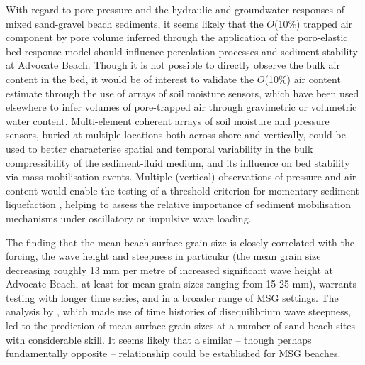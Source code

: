 With regard to pore pressure and the hydraulic and groundwater responses of mixed sand-gravel beach sediments, it seems likely that the $O$(10\%) trapped air component by pore volume inferred through the application of the \citet{Yamamoto_etal1978} poro-elastic bed response model should influence percolation processes and sediment stability at Advocate Beach. Though it is not possible to directly observe the bulk air content in the bed, it would be of interest to validate the $O$(10\%) air content estimate through the use of arrays of soil moisture sensors, which have been used elsewhere \citep[e.g.,][]{Heiss_etal2015} to infer volumes of pore-trapped air through gravimetric or volumetric water content. Multi-element coherent arrays of soil moisture and pressure sensors, buried at multiple locations both across-shore and vertically, could be used to better characterise spatial and temporal variability in the bulk compressibility of the sediment-fluid medium, and its influence on bed stability via mass mobilisation events. Multiple (vertical) observations of pressure and air content would enable the testing of a threshold criterion for momentary sediment liquefaction \citep[e.g.,][]{Qi_Gao2015}, helping to assess the relative importance of sediment mobilisation mechanisms under oscillatory or impulsive wave loading.

The finding that the mean beach surface grain size is closely correlated with the forcing, the wave height and steepness in particular (the mean grain size decreasing roughly 13 mm per metre of increased significant wave height at Advocate Beach, at least for mean grain sizes ranging from 15-25 mm), warrants testing with longer time series, and in a broader range of MSG settings. The analysis by \citet{Prodger_etal2016}, which made use of time histories of disequilibrium wave steepness, led to the prediction of mean surface grain sizes at a number of sand beach sites with considerable skill. It seems likely that a similar -- though perhaps fundamentally opposite -- relationship could be established for MSG beaches. 

